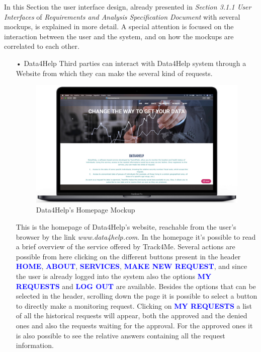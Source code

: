 \noindent
In this Section the user interface design, already presented in  \textit{Section 3.1.1 User Interfaces} of \textit{Requirements and Analysis Specification Document} with several mockups, is explained in more detail. A special attention is focused on the interaction between the user and the system, and on how the mockups are correlated to each other.
\bigbreak
\noindent
\begin{enumerate}
\item[•]{\Large Data4Help}
\bigbreak
\noindent
Third parties can interact with Data4Help system through a Website from which they can make the several kind of requests.
\begin{figure}[H]
        \centering
          \includegraphics[scale = 0.33]{Images/Mockups/Homepage.jpg}
          	\caption{Data4Help's Homepage Mockup}
\end{figure}
This is the homepage of Data4Help's website, reachable from the user's browser by the link \textit{www.data4help.com}. In the homepage it's possible to read a brief overview of the service offered by Track4Me. Several actions are possible from here clicking on the different buttons present in the header {\textcolor{Blue}{\textbf{HOME}}}, {\textcolor{Blue}{\textbf{ABOUT}}}, {\textcolor{Blue}{\textbf{SERVICES}}}, {\textcolor{Blue}{\textbf{MAKE NEW REQUEST}}}, and since the user is already logged into the system also the options {\textcolor{Blue}{\textbf{MY REQUESTS}}} and {\textcolor{Blue}{\textbf{LOG OUT}}} are available. Besides the options that can be selected in the header, scrolling down the page it is possible to select a button to directly make a monitoring request. 
\bigbreak
\noindent
Clicking on {\textcolor{Blue}{\textbf{MY REQUESTS}}} a list of all the historical requests will appear, both the approved and the denied ones and also the requests waiting for the approval. For the approved ones it is also possible to see the relative answers containing all the request information.
\clearpage


\end{enumerate}
